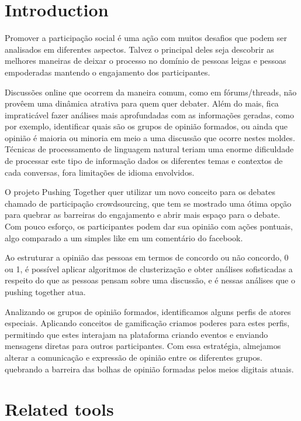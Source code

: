 \documentclass{llncs}
\begin{document}
\section{Introduction}
\label{sec:intro}
  Promover a participação social é uma ação com muitos desafios que podem
  ser analisados em diferentes aspectos. Talvez o principal deles seja descobrir
  as melhores maneiras de deixar o processo no domínio  de pessoas leigas e 
  pessoas empoderadas mantendo o engajamento dos participantes. 
  
  Discussões online que ocorrem da maneira comum, como em fórums/threads,
  não provêem uma dinâmica atrativa para quem quer debater. Além do mais, fica
  impraticável fazer análises mais aprofundadas com as informações geradas,
  como por exemplo, identificar quais são os grupos de opinião formados, ou ainda
  que opinião é maioria ou minoria em meio a uma discussão que ocorre nestes
  moldes. Técnicas de processamento de linguagem natural teriam uma enorme
  dificuldade de processar este tipo de informação dados os diferentes temas
  e contextos de cada conversas, fora limitações de idioma envolvidos.

  O projeto Pushing Together quer utilizar um novo conceito para os debates
  chamado de participação crowdsourcing, que tem se mostrado uma ótima opção
  para quebrar as barreiras do engajamento e abrir mais espaço para o debate. Com
  pouco esforço, os participantes podem dar sua opinião com ações pontuais,
  algo comparado a um simples like em um comentário do facebook.

  Ao estruturar a opinião das pessoas em termos de concordo ou não concordo, 0 ou 1, é
  possível aplicar algoritmos de clusterização e obter análises sofisticadas a
  respeito do que as pessoas pensam sobre uma discussão, e é nessas análises que o pushing together atua.

  Analizando os grupos de opinião formados, identificamos alguns perfis de
  atores especiais. Aplicando conceitos de gamificação criamos poderes para
  estes perfis, permitindo que estes interajam na plataforma criando
  eventos e enviando mensagens diretas para outros participantes. Com essa
  estratégia, almejamos alterar a comunicação e expressão de opinião entre os diferentes grupos.
  quebrando a barreira das bolhas de opinião formadas pelos meios digitais atuais.

\section{Related tools}
\end{document}
